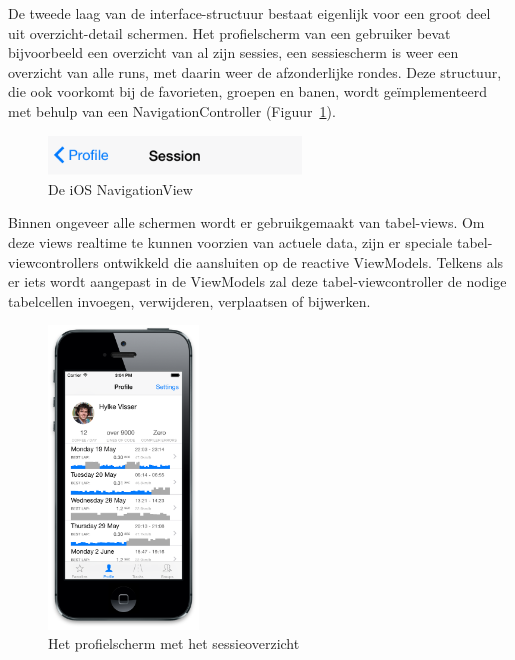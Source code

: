 De tweede laag van de interface-structuur bestaat eigenlijk voor een groot deel uit overzicht-detail schermen. Het profielscherm van een gebruiker bevat bijvoorbeeld een overzicht van al zijn sessies, een sessiescherm is weer een overzicht van alle runs, met daarin weer de afzonderlijke rondes. Deze structuur, die ook voorkomt bij de favorieten, groepen en banen, wordt geïmplementeerd met behulp van een NavigationController (Figuur~\ref{fig:navigation-view}).

\begin{figure}[h!]
\centering
\includegraphics[width=0.6\textwidth]{style/images/NavigationView}
\caption{De iOS NavigationView}
\label{fig:navigation-view}
\end{figure}

Binnen ongeveer alle schermen wordt er gebruikgemaakt van tabel-views. Om deze views realtime te kunnen voorzien van actuele data, zijn er speciale tabel-viewcontrollers ontwikkeld die aansluiten op de reactive ViewModels. Telkens als er iets wordt aangepast in de ViewModels zal deze tabel-viewcontroller de nodige tabelcellen invoegen, verwijderen, verplaatsen of bijwerken.

\begin{figure}
  \vspace{-5ex}
  \begin{center}
    \includegraphics[width=4cm]{style/images/screenshots/I-03-Home}
  \end{center}
  \caption{Het profielscherm met het sessieoverzicht}
  \label{fig:profiel-scherm}
\end{figure}

